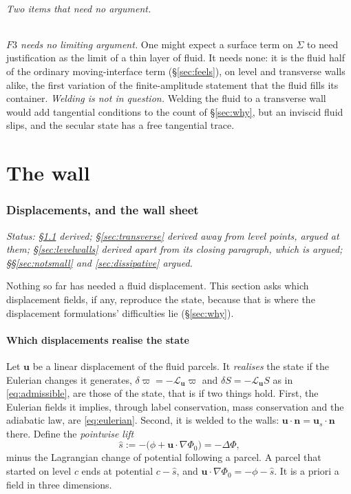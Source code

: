 \documentclass[11pt]{article}
\theoremstyle{definition}
\theoremstyle{remark}
\newcommand{\bu}{\mathbf{u}}
\newcommand{\bn}{\mathbf{n}}
\newcommand{\status}[1]{\noindent\emph{Status: #1}\par\smallskip}
\begin{document}
\paragraph{Two items that need no argument.} \emph{$F3$ needs no
limiting argument.} One might expect a surface term on $\Sigma$ to need
justification as the limit of a thin layer of fluid. It needs none: it
is the fluid half of the ordinary moving-interface term
(\S\ref{sec:feels}), on level and transverse walls alike, the first
variation of the finite-amplitude statement that the fluid fills its
container. \emph{Welding is not in question.} Welding the fluid to a
transverse wall would add tangential conditions to the count of
\S\ref{sec:why}, but an inviscid fluid slips, and the secular state has
a free tangential trace.

\part{The wall}

\section{Displacements, and the wall sheet}
\label{sec:disp}

\status{\S\ref{sec:realise} derived; \S\ref{sec:transverse} derived
away from level points, argued at them; \S\ref{sec:levelwalls} derived
apart from its closing paragraph, which is argued; \S\S\ref{sec:notsmall}
and \ref{sec:dissipative} argued.}

Nothing so far has needed a fluid displacement. This section asks
which displacement fields, if any, reproduce the state, because that
is where the displacement formulations' difficulties lie
(\S\ref{sec:why}).

\subsection{Which displacements realise the state}
\label{sec:realise}

Let $\bu$ be a linear displacement of the fluid parcels. It
\emph{realises} the state if the Eulerian changes it generates,
$\delta\varpi = -\mathcal L_{\bu}\varpi$ and $\delta S = -\mathcal
L_{\bu}S$ as in \eqref{eq:admissible}, are those of the state, that is
if two things hold. First, the Eulerian fields it implies, through
label conservation, mass conservation and the adiabatic law, are
\eqref{eq:eulerian}. Second, it is welded to the walls: $\bu\cdot\bn =
\bu_s\cdot\bn$ there. Define the \emph{pointwise lift}
\begin{equation*}
  \hat s := -\bigl(\phi + \bu\cdot\nabla\Phi_0\bigr) = -\Delta\Phi ,
\end{equation*}
minus the Lagrangian change of potential following a parcel. A parcel
that started on level $c$ ends at potential $c - \hat s$, and
$\bu\cdot\nabla\Phi_0 = -\phi - \hat s$. It is a priori a field in three dimensions.
\end{document}
